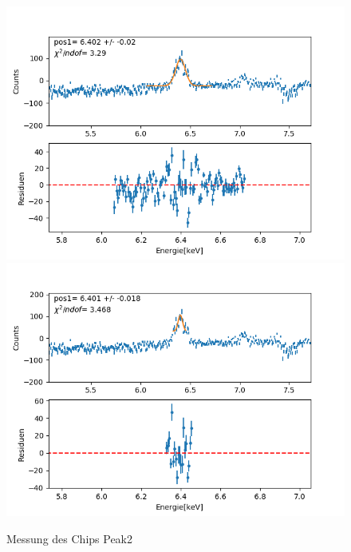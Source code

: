 \documentclass[12pt,a4paper]{article}
\begin{document}
\begin{figure}[H]
\centering
\includegraphics[scale=0.49]{Bilder/roentgen_spektren/chip/chip2_1.png}
\includegraphics[scale=0.49]{Bilder/roentgen_spektren/chip/chip2_2.png}
\caption{Messung des Chips Peak2}
\end{figure}
\end{document}
